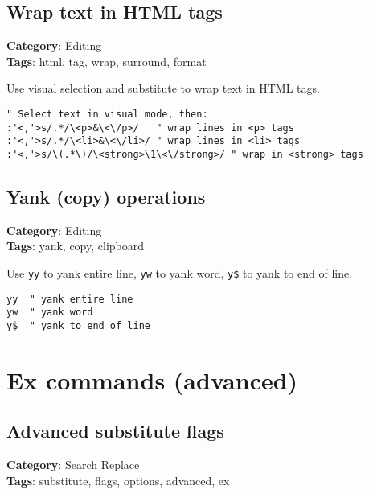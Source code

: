 {{{{\section{Wrap text in HTML tags}

\textbf{Category}: Editing\\ \textbf{Tags}: html, tag, wrap, surround, format
\vspace{0.5cm}

Use visual selection and substitute to wrap text in HTML tags.

\begin{Exa*}{}
\begin{Verbatim}[fontsize=\footnotesize, breaklines, breakanywhere]
" Select text in visual mode, then:
:'<,'>s/.*/\<p>&\<\/p>/   " wrap lines in <p> tags
:'<,'>s/.*/\<li>&\<\/li>/ " wrap lines in <li> tags
:'<,'>s/\(.*\)/\<strong>\1\<\/strong>/ " wrap in <strong> tags
\end{Verbatim}
\end{Exa*}

\section{Yank (copy) operations}

\textbf{Category}: Editing\\ \textbf{Tags}: yank, copy, clipboard
\vspace{0.5cm}

Use {\footnotesize \Verb§yy§} to yank entire line, {\footnotesize \Verb§yw§} to yank word, {\footnotesize \Verb§y$§} to yank to end of line.

\begin{Exa*}{}
\begin{Verbatim}[fontsize=\footnotesize, breaklines, breakanywhere]
yy  " yank entire line
yw  " yank word
y$  " yank to end of line
\end{Verbatim}
\end{Exa*}

\chapter{Ex commands (advanced)}
\section{Advanced substitute flags}

\textbf{Category}: Search Replace\\ \textbf{Tags}: substitute, flags, options, advanced, ex
\vspace{0.5cm}

}}}}

